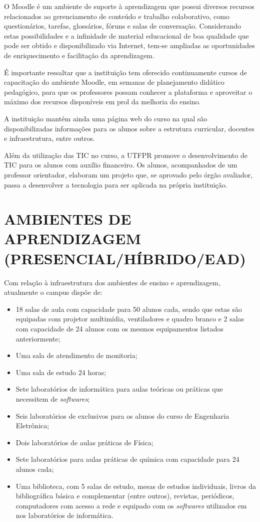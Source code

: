 O Moodle é um ambiente de suporte à aprendizagem que possui diversos recursos relacionados ao gerenciamento de conteúdo e trabalho colaborativo, como questionários, tarefas, glossários, fóruns e salas de conversação. Considerando estas possibilidades e a infinidade de material educacional de boa qualidade que pode ser obtido e disponibilizado via Internet, tem-se ampliadas as oportunidades de enriquecimento e facilitação da aprendizagem.

É importante ressaltar que a instituição tem oferecido continuamente cursos de capacitação do ambiente Moodle, em semanas de planejamento didático pedagógico, para que os professores possam conhecer a plataforma e aproveitar o máximo dos recursos disponíveis em prol da melhoria do ensino.

A instituição mantém ainda uma página web do curso na qual são disponibilizadas informações para os alunos sobre a estrutura curricular, docentes e infraestrutura, entre outros.

Além da utilização das TIC no curso, a UTFPR promove o desenvolvimento de TIC para os alunos com auxílio financeiro. Os alunos, acompanhados de um professor orientador, elaboram um projeto que, se aprovado pelo órgão avaliador, passa a desenvolver a tecnologia para ser aplicada na própria instituição.


\section{AMBIENTES DE APRENDIZAGEM (PRESENCIAL/HÍBRIDO/EAD)}
\label{sec:amb}

Com relação à infraestrutura dos ambientes de ensino e aprendizagem, atualmente o campus dispõe de:

\begin{itemize}
    \item 18 salas de aula com capacidade para 50 alunos cada, sendo que estas são equipadas com projetor multimídia, ventiladores e quadro branco e 2 salas com capacidade de 24 alunos com os mesmos equipamentos listados anteriormente;
    \item Uma sala de atendimento de monitoria;
    \item Uma sala de estudo 24 horas;
    \item Sete laboratórios de informática para aulas teóricas ou práticas que necessitem de \textit{softwares};
    \item Seis laboratórios de exclusivos para os alunos do curso de Engenharia Eletrônica;
    \item Dois laboratórios de aulas práticas de Física;
    \item Sete laboratórios para aulas práticas de química com capacidade para 24 alunos cada;
    \item Uma biblioteca, com 5 salas de estudo, mesas de estudos individuais, livros da bibliográfica básica e complementar (entre outros), revistas, periódicos, computadores com acesso a rede e equipado com os \textit{softwares} utilizados em nos laboratórios de informática.
\end{itemize}

